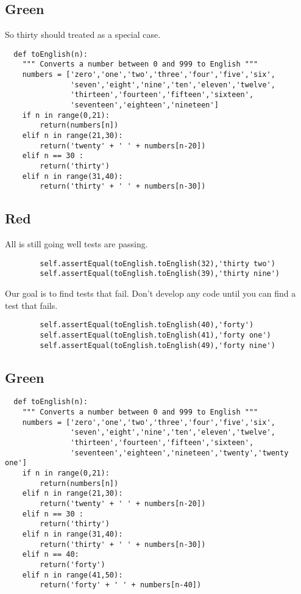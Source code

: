 \documentclass{paper}
\begin{document}
\subsection{Green}
So thirty should  treated as a special case.
\begin{lstlisting}
  def toEnglish(n):
    """ Converts a number between 0 and 999 to English """
    numbers = ['zero','one','two','three','four','five','six',
               'seven','eight','nine','ten','eleven','twelve',
               'thirteen','fourteen','fifteen','sixteen',
               'seventeen','eighteen','nineteen']
    if n in range(0,21):
        return(numbers[n])
    elif n in range(21,30):
        return('twenty' + ' ' + numbers[n-20])
    elif n == 30 :
        return('thirty')
    elif n in range(31,40):
        return('thirty' + ' ' + numbers[n-30])
\end{lstlisting}
\subsection{Red}
All is still going well tests are passing. 
\begin{lstlisting}
        self.assertEqual(toEnglish.toEnglish(32),'thirty two')
        self.assertEqual(toEnglish.toEnglish(39),'thirty nine')
\end{lstlisting}
Our goal is to find tests that fail. Don't develop any code until you
can find a test that fails.
\begin{lstlisting}
        self.assertEqual(toEnglish.toEnglish(40),'forty')
        self.assertEqual(toEnglish.toEnglish(41),'forty one')
        self.assertEqual(toEnglish.toEnglish(49),'forty nine')
\end{lstlisting}
\subsection{Green}
\begin{lstlisting}
  def toEnglish(n):
    """ Converts a number between 0 and 999 to English """
    numbers = ['zero','one','two','three','four','five','six',
               'seven','eight','nine','ten','eleven','twelve',
               'thirteen','fourteen','fifteen','sixteen',
               'seventeen','eighteen','nineteen','twenty','twenty one']
    if n in range(0,21):
        return(numbers[n])
    elif n in range(21,30):
        return('twenty' + ' ' + numbers[n-20])
    elif n == 30 :
        return('thirty')
    elif n in range(31,40):
        return('thirty' + ' ' + numbers[n-30])
    elif n == 40:
        return('forty')
    elif n in range(41,50):
        return('forty' + ' ' + numbers[n-40])
\end{lstlisting}
\end{document}
